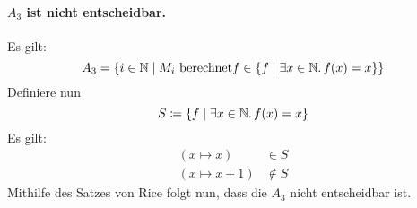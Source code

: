 \paragraph{$A_3$ ist nicht entscheidbar.}
Es gilt:
\[
	A_3 = \{ i \in \Nat \mid M_i\ \text{berechnet} f \in \{f \mid
	\exists x \in \Nat .\, f(x) = x\} \}
\]
Definiere nun
\[
	S \coloneqq \{f \mid \exists x \in \mathbb{N} .\, f(x) = x\}
\]
Es gilt:
\begin{align*}
	(x \mapsto x) & \in S \\
	(x \mapsto x+1) & \notin S
\end{align*}
Mithilfe des Satzes von Rice folgt nun, dass die $A_3$ nicht entscheidbar ist.
\par
